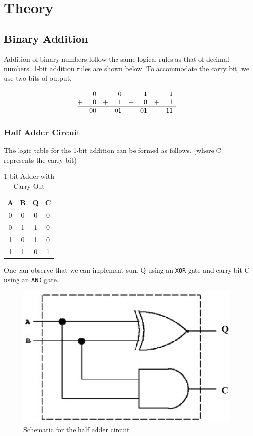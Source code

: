 \section{Theory}

\subsection*{Binary Addition}
Addition of binary numbers follow the same logical rules as that of decimal numbers. 1-bit addition rules are shown below. To accommodate the carry bit, we use two bits of output.

\[
\begin{array}{@{}cr@{\,\,\,\,\,\,}rr@{\,\,\,\,\,\,}rr@{\,\,\,\,\,\,}rr}
    & 0 & & 0 & & 1 & & 1\\
+  & 0 & + & 1& + & 0& + & 1\\ \hline
  & 00 & & 01 && 01 && 11
\end{array}
\]

\subsubsection*{Half Adder Circuit}

The logic table for the 1-bit addition can be formed as follows, (where C represents the carry bit)

\begin{table}[H]
    \centering
    \begin{tabular}{|c|c|c|c|}\hline
    A & B & Q & C \\ \hline
    0 & 0 & 0 & 0 \\ 
    0 & 1 & 1 & 0 \\ 
    1 & 0 & 1 & 0 \\ 
    1 & 1 & 0 & 1 \\ \hline
    \end{tabular}
    \caption{1-bit Adder with Carry-Out}
\end{table}

One can observe that we can implement sum Q using an \verb|XOR| gate and carry bit C using an \verb|AND| gate.

\begin{figure}[H]
    \centering
    \includegraphics[width=0.5\columnwidth]{images/half-adder.png}
    \caption{Schematic for the half adder circuit}
    \label{half-adder}
\end{figure}


